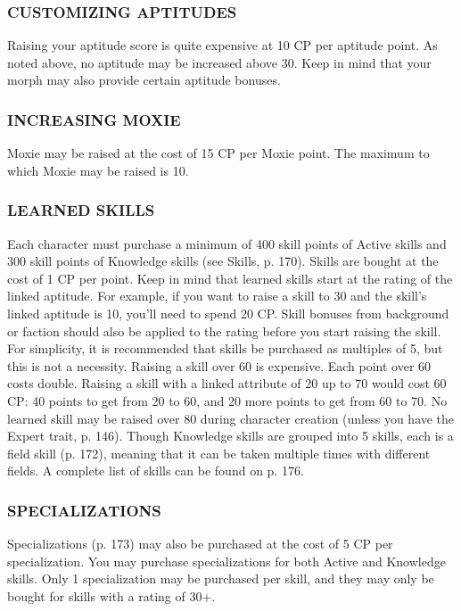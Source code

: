 \subsubsection{CUSTOMIZING APTITUDES} Raising your aptitude score is quite
expensive at 10 CP per aptitude point. As noted above, no aptitude may be
increased above 30. Keep in mind that your morph may also provide certain
aptitude bonuses.

\subsubsection{INCREASING MOXIE} Moxie may be raised at the cost of 15 CP per
Moxie point. The maximum to which Moxie may be raised is 10.  %

\subsubsection{LEARNED SKILLS} Each character must purchase a minimum of 400
skill points of Active skills and 300 skill points of Knowledge skills (see
Skills, p. 170). Skills are bought at the cost of 1 CP per point. Keep in mind
that learned skills start at the rating of the linked aptitude. For example, if
you want to raise a skill to 30 and the skill’s linked aptitude is 10, you’ll
need to spend 20 CP.  Skill bonuses from background or faction should also be
applied to the rating before you start raising the skill. For simplicity, it is
recommended that skills be purchased as multiples of 5, but this is not a
necessity.  Raising a skill over 60 is expensive. Each point over 60 costs
double. Raising a skill with a linked attribute of 20 up to 70 would cost 60
CP: 40 points to get from 20 to 60, and 20 more points to get from 60 to 70.
No learned skill may be raised over 80 during character creation (unless you
have the Expert trait, p. 146).  Though Knowledge skills are grouped into 5
skills, each is a field skill (p. 172), meaning that it can be taken multiple
times with different fields.  A complete list of skills can be found on p. 176.

\subsubsection{SPECIALIZATIONS}
Specializations (p. 173) may also be purchased at the cost of 5 CP per
specialization. You may purchase specializations for both Active and Knowledge
skills.  Only 1 specialization may be purchased per skill, and they may only be
bought for skills with a rating of 30+.

